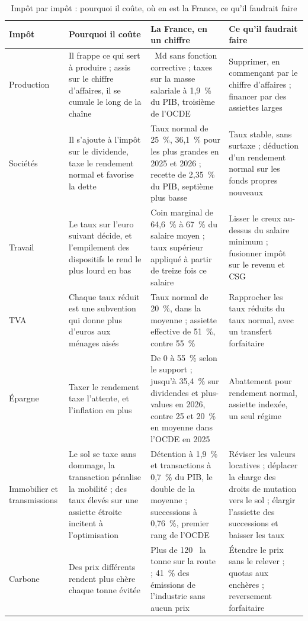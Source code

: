 \documentclass[11pt,a4paper]{article}
\providecommand{\euro}{\texteuro}
\renewcommand{\arraystretch}{1.22}
\begin{document}
\begin{table}[htbp]
\caption{Impôt par impôt : pourquoi il coûte, où en est la France, ce qu'il faudrait faire}
\label{tab:synthese}
\footnotesize
\renewcommand{\arraystretch}{1.3}
\begin{tabularx}{\linewidth}{@{}>{\raggedright\arraybackslash}p{2.2cm}
  >{\raggedright\arraybackslash}X>{\raggedright\arraybackslash}X>{\raggedright\arraybackslash}X@{}}
\toprule
\textbf{Impôt} & \textbf{Pourquoi il coûte} & \textbf{La France, en un chiffre} &
\textbf{Ce qu'il faudrait faire}\\
\midrule
Production & Il frappe ce qui sert à produire ; assis sur le chiffre d'affaires, il se cumule le
long de la chaîne & 77~Md\euro{} sans fonction corrective ; taxes sur la masse salariale à
1,9~\% du PIB, troisième de l'OCDE & Supprimer, en commençant par le chiffre d'affaires ;
financer par des assiettes larges\\
\midrule
Sociétés & Il s'ajoute à l'impôt sur le dividende, taxe le rendement normal et favorise la dette &
Taux normal de 25~\%, 36,1~\% pour les plus grandes en 2025 et 2026 ;
recette de 2,35~\% du PIB, septième plus basse &
Taux stable, sans surtaxe ; déduction d'un rendement normal sur les fonds propres nouveaux\\
\midrule
Travail & Le taux sur l'euro suivant décide, et l'empilement des dispositifs le rend le plus lourd en
bas & Coin marginal de 64,6~\% à 67~\% du salaire moyen ; taux supérieur appliqué à partir de treize
fois ce salaire & Lisser le creux au-dessus du salaire minimum ; fusionner impôt sur le revenu et
CSG\\
\midrule
TVA & Chaque taux réduit est une subvention qui donne plus d'euros aux ménages aisés & Taux normal
de 20~\%, dans la moyenne ; assiette effective de 51~\%, contre 55~\% & Rapprocher les taux réduits
du taux normal, avec un transfert forfaitaire\\
\midrule
Épargne & Taxer le rendement taxe l'attente, et l'inflation en plus & De 0 à 55~\% selon le
support ; jusqu'à 35,4~\% sur dividendes et plus-values en 2026, contre 25 et 20~\% en moyenne
dans l'OCDE en 2025 & Abattement pour
rendement normal, assiette indexée, un seul régime\\
\midrule
Immobilier et transmissions & Le sol se taxe sans dommage, la transaction pénalise la mobilité ;
des taux élevés sur une assiette étroite incitent à l'optimisation & Détention à 1,9~\% et
transactions à 0,7~\% du PIB, le double de la moyenne ; successions à 0,76~\%, premier rang de
l'OCDE & Réviser les valeurs locatives ; déplacer la charge des droits de mutation vers le sol ;
élargir l'assiette des successions et baisser les taux\\
\midrule
Carbone & Des prix différents rendent plus chère chaque tonne évitée & Plus de 120~\euro{} la tonne
sur la route ; 41~\% des émissions de l'industrie sans aucun prix & Étendre le prix sans le relever ;
quotas aux enchères ; reversement forfaitaire\\
\bottomrule
\end{tabularx}
\end{table}
\end{document}
